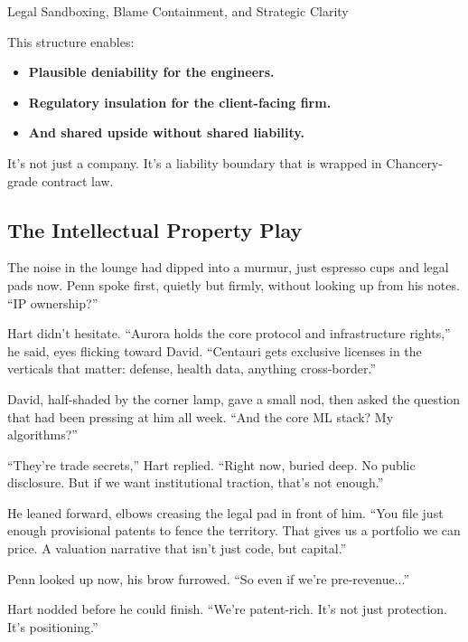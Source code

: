 \begin{TechnicalSidebar}{Legal Sandboxing, Blame Containment, and Strategic Clarity}
  \medskip
  
  This structure enables:

  \medskip
  
  \begin{itemize}
  \item \textbf{Plausible deniability for the engineers.}  
  \item \textbf{Regulatory insulation for the client-facing firm.}  
  \item \textbf{And shared upside without shared liability.}
  \end{itemize}

  \medskip
  
  It’s not just a company. It’s a liability boundary that is wrapped in Chancery-grade contract law.
  
\end{TechnicalSidebar}

\medskip

\subsection{The Intellectual Property Play}

The noise in the lounge had dipped into a murmur, just espresso cups and legal pads now. Penn spoke first, quietly but 
firmly, without looking up from his notes. “IP ownership?”

Hart didn’t hesitate. ``Aurora holds the core protocol and infrastructure rights,” he said, eyes flicking toward David. 
“Centauri gets exclusive licenses in the verticals that matter: defense, health data, anything cross-border.''

David, half-shaded by the corner lamp, gave a small nod, then asked the question that had been pressing at him all week. 
``And the core ML stack? My algorithms?''

``They’re trade secrets,'' Hart replied. ``Right now, buried deep. No public disclosure. But if we want institutional traction, 
that’s not enough.''

He leaned forward, elbows creasing the legal pad in front of him. ``You file just enough provisional patents to fence the 
territory. That gives us a portfolio we can price. A valuation narrative that isn’t just code, but capital.''

Penn looked up now, his brow furrowed. ``So even if we’re pre-revenue...''

Hart nodded before he could finish. ``We’re patent-rich. It’s not just protection. It’s positioning.''

